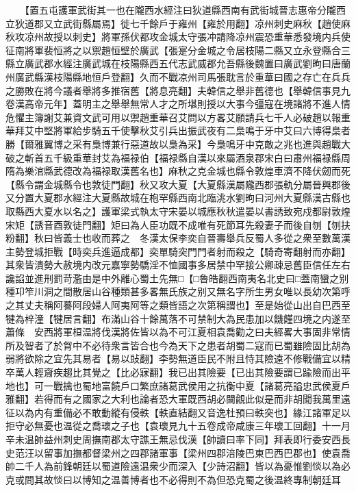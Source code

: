 　　【置五屯護軍武街其一也在隴西水經注曰狄道縣西南有武街城晉志惠帝分隴西立狄道郡又立武街縣屬焉】徙七千餘戶于雍州【雍於用翻】凉州刺史麻秋【趙使麻秋攻凉州故授以刺史】將軍孫伏都攻金城太守張冲請降凉州震恐重華悉發境内兵使征南將軍裴恒將之以禦趙恒壁於廣武【張寔分金城之令居枝陽二縣又立永登縣合三縣立廣武郡水經注廣武城在枝陽縣西五代志武威郡允吾縣後魏置曰廣武劉昫曰唐蘭州廣武縣漢枝陽縣地恒戶登翻】久而不戰凉州司馬張耽言於重華曰國之存亡在兵兵之勝敗在將今議者舉將多推宿舊【將息亮翻】夫韓信之舉非舊德也【舉韓信事見九卷漢高帝元年】蓋明主之舉舉無常人才之所堪則授以大事今彊寇在境諸將不進人情危懼主簿謝艾兼資文武可用以禦趙重華召艾問以方畧艾願請兵七千人必破趙以報重華拜艾中堅將軍給步騎五千使擊秋艾引兵出振武夜有二梟鳴于牙中艾曰六博得梟者勝【爾雅翼博之采有梟博兼行惡道故以梟為采】今梟鳴牙中克敵之兆也進與趙戰大破之斬首五千級重華封艾為福禄伯【福禄縣自漢以來屬酒泉郡宋白曰肅州福禄縣周隋為樂涫縣武德改為福禄取漢舊名也】麻秋之克金城也縣令敦煌車濟不降伏劒而死【縣令謂金城縣令也敦徒門翻】秋又攻大夏【大夏縣漢屬隴西郡張軌分屬晉興郡後又分置大夏郡水經注大夏縣故城在枹罕縣西南北臨洮水劉昫曰河州大夏縣漢古縣也取縣西大夏水以名之】護軍梁式執太守宋晏以城應秋秋遣晏以書誘致宛戍都尉敦煌宋矩【誘音酉敦徒門翻】矩曰為人臣功既不成唯有死節耳先殺妻子而後自刎【刎扶粉翻】秋曰皆義士也收而葬之　冬漢太保李奕自晉壽舉兵反蜀人多從之衆至數萬漢主勢登城拒戰【時奕兵進逼成都】奕單騎突門門者射而殺之【騎奇寄翻射而亦翻】其衆皆潰勢大赦境内改元嘉寧勢驕淫不恤國事多居禁中罕接公卿疎忌舊臣信任左右讒諂並進刑罰苛濫由是中外離心蜀土先無□【□魯皓翻西南夷名北史曰□蓋南蠻之别種卭笮川洞之間散居山谷種類甚多畧無氏族之别又無名字所生男女唯以長幼次第呼之其丈夫稱阿謩阿段婦人阿夷阿等之類皆語之次第稱謂也】至是始從山出自巴西至犍為梓潼【犍居言翻】布滿山谷十餘萬落不可禁制大為民患加以饑饉四境之内遂至蕭條　安西將軍桓温將伐漢將佐皆以為不可江夏相袁喬勸之曰夫經畧大事固非常情所及智者了於胷中不必待衆言皆合也今為天下之患者胡蜀二寇而已蜀雖險固比胡為弱將欲除之宜先其易者【易以䜴翻】李勢無道臣民不附且恃其險遠不修戰備宜以精卒萬人輕齎疾趨比其覺之【比必寐翻】我已出其險要【已出其險要謂已踰險而出平地也】可一戰擒也蜀地富饒戶口繁庶諸葛武侯用之抗衡中夏【諸葛亮謚忠武侯夏戶雅翻】若得而有之國家之大利也論者恐大軍既西胡必闚覦此似是而非胡聞我萬里遠征以為内有重備必不敢動縱有侵軼【軼直結翻又音逸杜預曰軼突也】緣江諸軍足以拒守必無憂也温從之喬瓌之子也【袁瓌見九十五卷成帝咸康三年瓌工回翻】十一月辛未温帥益州刺史周撫南郡太守譙王無忌伐漢【帥讀曰率下同】拜表即行委安西長史范汪以留事加撫都督梁州之四郡諸軍事【梁州四郡涪陵巴東巴西巴郡也】使袁喬帥二千人為前鋒朝廷以蜀道險遠温衆少而深入【少詩沼翻】皆以為憂惟劉惔以為必克或問其故惔曰以博知之温善博者也不必得則不為但恐克蜀之後温終專制朝廷耳

